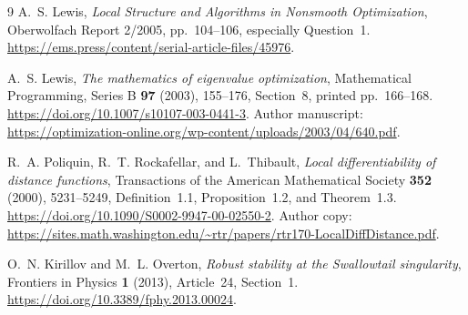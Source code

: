 \documentclass[11pt]{article}
\begin{document}
\begin{thebibliography}{9}
A.~S. Lewis,
\emph{Local Structure and Algorithms in Nonsmooth Optimization},
Oberwolfach Report 2/2005, pp.~104--106, especially Question~1.
\url{https://ems.press/content/serial-article-files/45976}.

A.~S. Lewis,
\emph{The mathematics of eigenvalue optimization},
Mathematical Programming, Series B \textbf{97} (2003), 155--176,
Section~8, printed pp.~166--168.
\url{https://doi.org/10.1007/s10107-003-0441-3}.
Author manuscript:
\url{https://optimization-online.org/wp-content/uploads/2003/04/640.pdf}.

R.~A. Poliquin, R.~T. Rockafellar, and L.~Thibault,
\emph{Local differentiability of distance functions},
Transactions of the American Mathematical Society
\textbf{352} (2000), 5231--5249,
Definition~1.1, Proposition~1.2, and Theorem~1.3.
\url{https://doi.org/10.1090/S0002-9947-00-02550-2}.
Author copy:
\url{https://sites.math.washington.edu/~rtr/papers/rtr170-LocalDiffDistance.pdf}.

O.~N. Kirillov and M.~L. Overton,
\emph{Robust stability at the Swallowtail singularity},
Frontiers in Physics \textbf{1} (2013), Article~24,
Section~1.
\url{https://doi.org/10.3389/fphy.2013.00024}.
\end{thebibliography}
\end{document}
